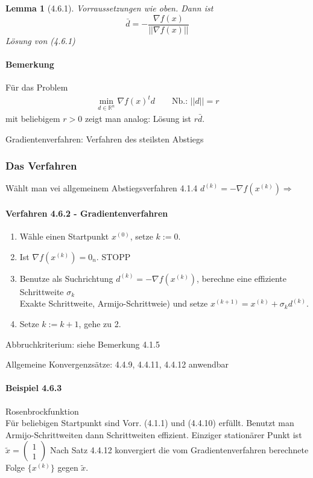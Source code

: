 \documentclass[ngerman,halfparskip]{scrartcl}
\newtheorem*{lemma}{Lemma}
\theoremstyle{definition}
\newcommand*{\R}{\mathbb{R}}      %
\begin{document}
\begin{lemma}[4.6.1]
Vorraussetzungen wie oben. Dann ist 
$$\bar d = - \frac {\nabla f(x)}{||\nabla f(x)||}$$
Lösung von (4.6.1)
\end{lemma}
\paragraph{Bemerkung} Für das Problem
\begin{gather*}\tag{4.6.2}
\min\limits_{d\in\R^n}\nabla f(x)^td \qquad \text{Nb.: }||d||=r
\end{gather*}
mit beliebigem $r>0$ zeigt man analog: Lösung ist $r\bar d$.

Gradientenverfahren: Verfahren des steilsten Abstiegs

\subsubsection{Das Verfahren}
Wählt man vei allgemeinem Abstiegsverfahren 4.1.4 $d^{(k)}=-\nabla f(x^{(k)}) \Rightarrow$
\paragraph{Verfahren 4.6.2 - Gradientenverfahren} 
\begin{enumerate}
\item Wähle einen Startpunkt $x^{(0)}$, setze $k:=0$.
\item Ist $\nabla f (x^{(k)})=0_n$. STOPP
\item Benutze als Suchrichtung $d^{(k)}=-\nabla f(x^{(k)})$, berechne eine effiziente Schrittweite $\sigma_k$\\
Exakte Schrittweite, Armijo-Schrittweie) und setze $x^{(k+1)}=x^{(k)}+\sigma_k d^{(k)}$.
\item Setze $k:=k+1$, gehe zu 2.
\end{enumerate}

Abbruchkriterium: siehe Bemerkung 4.1.5

Allgemeine Konvergenzsätze: 4.4.9, 4.4.11, 4.4.12 anwendbar

\paragraph{Beispiel 4.6.3} Rosenbrockfunktion\\
Für beliebigen Startpunkt sind Vorr. (4.1.1) und (4.4.10) erfüllt. Benutzt man Armijo-Schrittweiten dann Schrittweiten effizient. Einziger stationärer Punkt ist $\tilde x = \begin{pmatrix}
1\\1
\end{pmatrix}
$ Nach Satz 4.4.12 konvergiert die vom Gradientenverfahren berechnete Folge $\{x^{(k)}\}$ gegen $\tilde x$.
\end{document}
